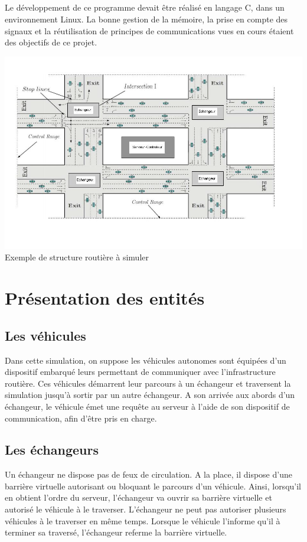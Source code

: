 \documentclass{report}
\begin{document}
	\paragraph{}
	Le développement de ce programme devait être réalisé en langage C, dans un environnement Linux. La bonne gestion de la mémoire, la prise en compte des signaux et la réutilisation de principes de communications vues en cours étaient des objectifs de ce projet.
	\begin{center}
			\includegraphics[scale=0.37]{simulation.png}	
			Exemple de structure routière à simuler
	\end{center}
	
	
\chapter{Présentation des entités}

	\section{Les véhicules}
	Dans cette simulation, on suppose les véhicules autonomes sont équipées d'un dispositif embarqué leurs permettant de communiquer avec l'infrastructure routière. Ces véhicules démarrent leur parcours à un échangeur et traversent la simulation jusqu'à sortir par un autre échangeur. A son arrivée aux abords d'un échangeur, le véhicule émet une requête au serveur à l'aide de son dispositif de communication, afin d'être pris en charge.
	
	\section{Les échangeurs}
	Un échangeur ne dispose pas de feux de circulation. A la place, il dispose d'une barrière virtuelle autorisant ou bloquant le parcours d'un véhicule. Ainsi, lorsqu'il en obtient l'ordre du serveur, l'échangeur va ouvrir sa barrière virtuelle et autorisé le véhicule à le traverser. L'échangeur ne peut pas autoriser plusieurs véhicules à le traverser en même temps. Lorsque le véhicule l'informe qu'il à terminer sa traversé, l'échangeur referme la barrière virtuelle.
	
\end{document}
